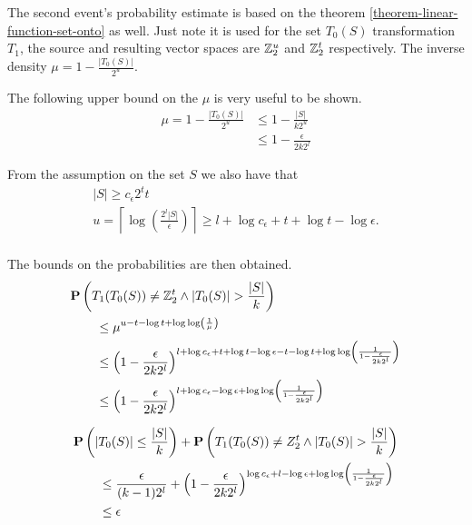 The second event's probability estimate is based on the theorem \ref{theorem-linear-function-set-onto} as well. Just note it is used for the set $T_0(S)$ transformation $T_1$, the source and resulting vector spaces are $\mathbb{Z}_{2}^{u}$ and $\mathbb{Z}_{2}^{t}$ respectively. The inverse density $\mu = 1 - \frac{|T_0(S)|}{2^u}$.

The following upper bound on the $\mu$ is very useful to be shown.
\[
\begin{split}
\mu = 1 - \frac{|T_0(S)|}{2^u} 
	& \leq 1 - \frac{|S|}{k 2 ^ u} \\
	& \leq 1 - \frac{\epsilon}{2 k 2 ^ l}
\end{split}
\]

From the assumption on the set $S$ we also have that
\begin{gather*}
	|S| \geq c_\epsilon 2^t t \\
	u = \left\lceil \log \left(\frac{2^l |S|}{\epsilon}\right) \right\rceil \geq l + \log c_\epsilon + t + \log t - \log \epsilon \text{.} \\
\end{gather*}

The bounds on the probabilities are then obtained.
\[
\begin{split}
& \mathbf{P}\left(T_1(T_0(S)) \neq \mathbb{Z}_{2}^{t} \wedge |T_0(S)| > \frac{|S|}{k}\right) \\
	& \qquad \leq \mu ^ {u - t - \log t + \log \log \left(\frac{1}{\mu}\right)} \\
	& \qquad \leq \left(1 - \frac{\epsilon}{2 k 2 ^ l}\right)^{l + \log c_\epsilon + t + \log t - \log \epsilon - t - \log t + \log \log \left(\frac{1}{1 - \frac{\epsilon}{2 k 2 ^ l}}\right)} \\
	& \qquad \leq \left(1 - \frac{\epsilon}{2 k 2 ^ l}\right)^{l + \log c_\epsilon - \log \epsilon + \log \log \left(\frac{1}{1 - \frac{\epsilon}{2 k 2 ^ l}}\right)} \\
\end{split}
\]

\[
\begin{split}
& \mathbf{P}\left(|T_0(S)| \leq \frac{|S|}{k}\right) + \mathbf{P}\left(T_1(T_0(S)) \neq Z_2^t \wedge |T_0(S)| > \frac{|S|}{k}\right) \\ 
	& \qquad \leq \frac{\epsilon}{(k - 1) 2 ^ l} + \left(1 - \frac{\epsilon}{2 k 2^l}\right)^{\log c_\epsilon + l - \log \epsilon + \log \log \left(\frac{1}{1 - \frac{\epsilon}{2 k 2^l}}\right)} \\
	& \qquad \leq \epsilon \\
\end{split}
\]

